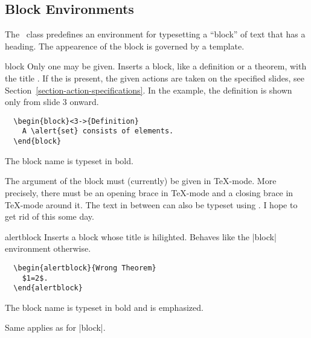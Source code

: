 \subsection{Block Environments}
\label{predefined}

The \beamer\ class predefines an environment for typesetting a
``block'' of text that has a heading. The appearence of the block is
governed by a template.

\begin{environment}{{block}}
  Only one  may be given.
  Inserts a block, like a definition or a theorem, with the title
  . If the  is present,
  the given actions are taken on the specified slides, see
  Section~\ref{section-action-specifications}. In the example, the 
  definition is shown only from slide 3 onward.
  \example
\begin{verbatim}
  \begin{block}<3->{Definition}
    A \alert{set} consists of elements.
  \end{block}
\end{verbatim}

  \articlenote
  The block name is typeset in bold.

  \lyxnote
  The argument of the block must (currently) be given in
  \TeX-mode. More precisely, there must be an opening brace in
  \TeX-mode and a closing brace in \TeX-mode around it. The text
  in between can also be typeset using \LyX. I hope to get rid of this
  some day.
\end{environment}


\begin{environment}{{alertblock}} 
  Inserts a block whose title is hilighted. Behaves like the |block|
  environment otherwise.
  \example
\begin{verbatim}
  \begin{alertblock}{Wrong Theorem}
    $1=2$.
  \end{alertblock}
\end{verbatim}

  \articlenote
  The block name is typeset in bold and is emphasized.

  \lyxnote
  Same applies as for |block|.
\end{environment}

